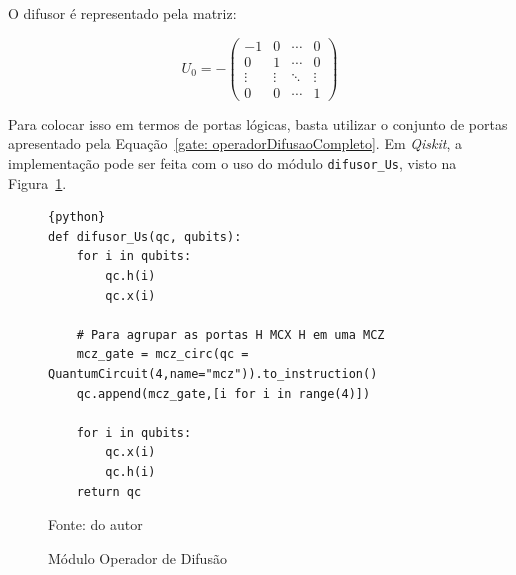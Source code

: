 O difusor é representado pela matriz:

\begin{equation}
U_0 = -
\begin{pmatrix}
-1 & 0 & \cdots & 0 \\
0 & 1 & \cdots & 0 \\
\vdots & \vdots & \ddots & \vdots \\
0 & 0 & \cdots & 1
\end{pmatrix}
\label{mtx: Difusao}
\end{equation}

Para colocar isso em termos de portas lógicas, basta utilizar o conjunto de portas apresentado pela Equação~\ref{gate: operadorDifusaoCompleto}. Em \emph{Qiskit}, a implementação pode ser feita com o uso do módulo \verb|difusor_Us|, visto na Figura~\ref{cod:difusao}.

\begin{figure}[!hb]
\centering
\caption{Módulo Operador de Difusão} 
\begin{lstlisting}{python}
def difusor_Us(qc, qubits):
    for i in qubits:
        qc.h(i)
        qc.x(i)

    # Para agrupar as portas H MCX H em uma MCZ
    mcz_gate = mcz_circ(qc = QuantumCircuit(4,name="mcz")).to_instruction() 
    qc.append(mcz_gate,[i for i in range(4)])

    for i in qubits:
        qc.x(i)
        qc.h(i)
    return qc
\end{lstlisting} 
{\small Fonte: do autor} 
\label{cod:difusao} 
\end{figure}

